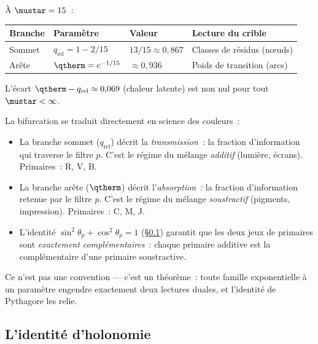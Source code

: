 \documentclass[12pt,a4paper]{article}
\providecommand{\qrel}{\ensuremath{q_{\mathrm{rel}}}}
\begin{document}
\`A $\mustar = 15$~:
\begin{center}
\begin{tabular}{llll}
\toprule
\textbf{Branche} & \textbf{Param\`etre} & \textbf{Valeur} & \textbf{Lecture du crible} \\
\midrule
Sommet & $\qrel = 1 - 2/15$ & $13/15 \approx 0{,}867$ & Classes de r\'esidus (n\oe{}uds) \\
Ar\^ete & $\qtherm = e^{-1/15}$ & $\approx 0{,}936$ & Poids de transition (arcs) \\
\bottomrule
\end{tabular}
\end{center}
L'\'ecart $\qtherm - \qrel \approx 0{,}069$ (chaleur latente) est
non nul pour tout $\mustar < \infty$.

\begin{remark}
La bifurcation se traduit directement en science des couleurs~:
\begin{itemize}[nosep]
\item La branche sommet ($\qrel$) d\'ecrit la \emph{transmission}~:
  la fraction d'information qui traverse le filtre $p$. C'est le
  r\'egime du m\'elange \emph{additif} (lumi\`ere, \'ecrans).
  Primaires~: R, V, B.
\item La branche ar\^ete ($\qtherm$) d\'ecrit l'\emph{absorption}~:
  la fraction d'information retenue par le filtre $p$. C'est le
  r\'egime du m\'elange \emph{soustractif} (pigments, impression).
  Primaires~: C, M, J.
\item L'identit\'e $\sin^2\!\theta_p + \cos^2\!\theta_p = 1$
  (\S\ref{app:holonomy}) garantit que les deux jeux de primaires
  sont \emph{exactement compl\'ementaires}~: chaque primaire additive
  est la compl\'ementaire d'une primaire soustractive.
\end{itemize}
Ce n'est pas une convention --- c'est un th\'eor\`eme~: toute famille
exponentielle \`a un param\`etre engendre exactement deux lectures
duales, et l'identit\'e de Pythagore les relie.
\end{remark}

\subsection{L'identit\'e d'holonomie}
\label{app:holonomy}
\end{document}
